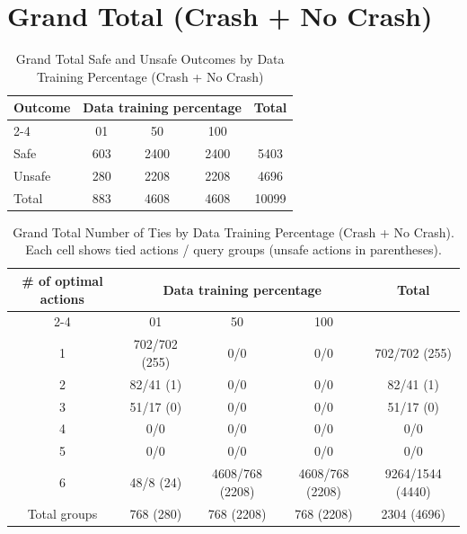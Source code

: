 \documentclass{article}
\begin{document}
\pagebreak
\section{Grand Total (Crash + No Crash)}

\begin{table}[h]
\centering
\caption{Grand Total Safe and Unsafe Outcomes by Data Training Percentage (Crash + No Crash)}
\begin{tabular}{l|ccc|c}
\toprule
\multirow{2}{*}{Outcome} & \multicolumn{3}{c|}{Data training percentage} & \multirow{2}{*}{Total} \\
\cmidrule{2-4}
 & 01 & 50 & 100 & \\
\midrule
Safe & 603 & 2400 & 2400 & 5403 \\ 
Unsafe & 280 & 2208 & 2208 & 4696 \\ 
\midrule
Total & 883 & 4608 & 4608 & 10099 \\ 
\bottomrule
\end{tabular}
\end{table}

\begin{table}[h]
\centering
\caption{Grand Total Number of Ties by Data Training Percentage (Crash + No Crash).
Each cell shows tied actions / query groups (unsafe actions in parentheses).}
\begin{tabular}{c|ccc|c}
\toprule
\multirow{2}{*}{\# of optimal actions} & \multicolumn{3}{c|}{Data training percentage} & \multirow{2}{*}{Total} \\
\cmidrule{2-4}
 & 01 & 50 & 100 & \\
\midrule
1 & 702/702 (255) & 0/0 & 0/0 & 702/702 (255) \\ 
2 & 82/41 (1) & 0/0 & 0/0 & 82/41 (1) \\ 
3 & 51/17 (0) & 0/0 & 0/0 & 51/17 (0) \\ 
4 & 0/0 & 0/0 & 0/0 & 0/0 \\ 
5 & 0/0 & 0/0 & 0/0 & 0/0 \\ 
6 & 48/8 (24) & 4608/768 (2208) & 4608/768 (2208) & 9264/1544 (4440) \\ 
\midrule
Total groups & 768 (280) & 768 (2208) & 768 (2208) & 2304 (4696) \\ 
\bottomrule
\end{tabular}
\end{table}
\end{document}
